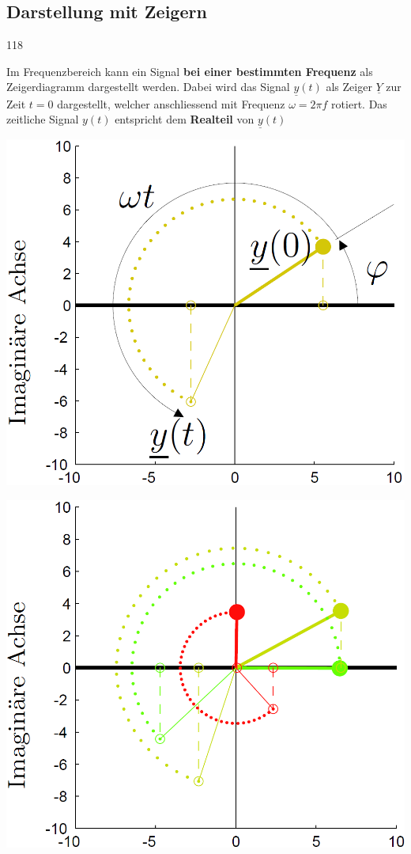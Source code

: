 \subsection{Darstellung mit Zeigern}{118}

Im Frequenzbereich kann ein Signal \textbf{bei einer bestimmten Frequenz} als Zeigerdiagramm dargestellt werden.
Dabei wird das Signal $\underline{y}(t)$ als Zeiger $\underline{Y}$ zur Zeit $t=0$ dargestellt, welcher anschliessend mit Frequenz $\omega = 2 \pi f$ rotiert.
Das zeitliche Signal $y(t)$ entspricht dem \textbf{Realteil} von $\underline{y}(t)$

\begin{minipage}[c]{0.4\columnwidth}
    \includegraphics[width=\columnwidth]{images/zeigerdiagramm_1.png}
\end{minipage}
\hfill
\begin{minipage}[c]{0.4\columnwidth}
    \includegraphics[width=\columnwidth]{images/zeigerdiagramm_2.png}
\end{minipage}


